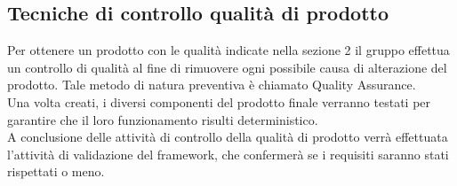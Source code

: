 	\subsection{Tecniche di controllo qualità di prodotto}
		Per ottenere un prodotto con le qualità indicate nella sezione 2 il gruppo \groupname{} effettua un controllo di qualità al fine di rimuovere 
		ogni possibile causa di alterazione del prodotto. Tale metodo di natura preventiva è chiamato Quality Assurance.\\
		Una volta creati, i diversi componenti del prodotto finale verranno testati per garantire che il loro funzionamento risulti deterministico.\\
		A conclusione delle attività di controllo della qualità di prodotto verrà effettuata l'attività di validazione del framework, che confermerà 
		se i requisiti saranno stati rispettati o meno.
